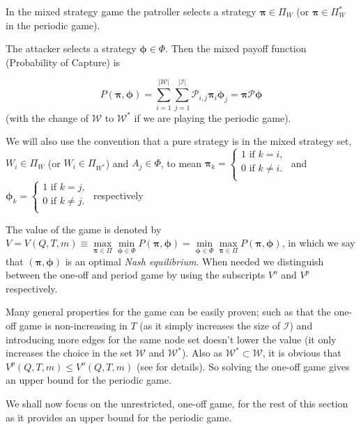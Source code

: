 \documentclass[a4paper,10pt]{article}
\theoremstyle{definition}
\theoremstyle{definition}
\theoremstyle{remark}
\theoremstyle{definition}
\begin{document}
In the mixed strategy game the patroller selects a strategy $\bm{\pi} \in \Pi_{W}$ (or $\bm{\pi}  \in \Pi_{W}^*$ in the periodic game).

The attacker selects a strategy $\bm{\phi} \in \Phi$. Then the mixed payoff function (Probability of Capture) is

$$
P(\bm{\pi} ,\bm{\phi})=\sum\limits_{i=1}^{|\mathcal{W}|} \sum\limits_{j=1}^{|\mathcal{I}|} \mathcal{P}_{i,j} \bm{\pi} _{i} \bm{\phi}_{j}
=\bm{\pi} \mathcal{P} \bm{\phi}
$$
(with the change of $\mathcal{W}$ to $\mathcal{W}^*$ if we are playing the periodic game).

We will also use the convention that a pure strategy is in the mixed strategy set, $W_{i} \in \Pi_{W}$ (or $W_{i} \in \Pi_{W^*}$) and $A_{j} \in \Phi$, to mean $\bm{\pi}_{k}=\left\{\begin{array}{c}
1 \text{ if } k=i, \\
0 \text{ if } k \neq i. \\
\end{array} \right.$
and
$\bm{\phi}_{k}=\left\{\begin{array}{c}
1 \text{ if } k=j, \\
0 \text{ if } k \neq j. \\
\end{array} \right.$ respectively

The value of the game is denoted by $V=V(Q,T,m) \equiv \max\limits_{\bm{\pi} \in \Pi} \min\limits_{\bm{\phi} \in \Phi} P(\bm{\pi},\bm{\phi})=\min\limits_{\bm{\phi} \in \Phi} \max\limits_{\bm{\pi} \in \Pi} P(\bm{\pi},\bm{\phi})$, in which we say that $(\bm{\pi},\bm{\phi})$ is an optimal \textit{Nash equilibrium}. When needed we distinguish between the one-off and period game by using the subscripts $V^{o}$ and $V^p$ respectively.

Many general properties for the game can be easily proven; such as that the one-off game is non-increasing in $T$ (as it simply increases the size of $\mathcal{I}$) and introducing more edges for the same node set doesn't lower the value (it only increases the choice in the set $\mathcal{W}$ and $\mathcal{W}^*$). Also as $\mathcal{W}^* \subset \mathcal{W}$, it is obvious that $V^{p} (Q,T,m) \leq V^{o} (Q,T,m)$ (see \cite{Alpern2011} for details). So solving the one-off game gives an upper bound for the periodic game.

We shall now focus on the unrestricted, one-off game, for the rest of this section as it provides an upper bound for the periodic game.
\end{document}
